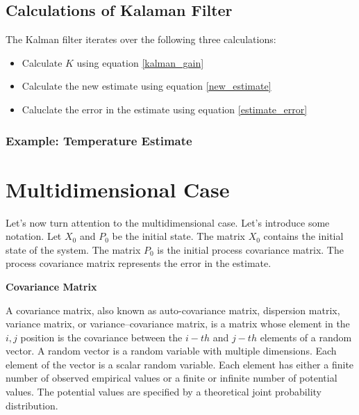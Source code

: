 \subsection{Calculations of Kalaman Filter}
The Kalman filter iterates over the following three calculations:

\begin{itemize}
\item Calculate $K$ using equation \ref{kalman_gain}
\item Calculate the new estimate using equation \ref{new_estimate} 
\item Caluclate the error in the estimate using equation \ref{estimate_error}
\end{itemize}


\subsubsection{Example: Temperature Estimate}



\section{Multidimensional Case}

Let's now turn attention to the multidimensional case. Let's introduce some notation. Let $X_0$ and $P_0$ be the initial state.
The matrix $X_0$ contains the initial state of the system. The matrix $P_0$ is the initial process covariance matrix. The process
covariance matrix represents the error in the estimate.


\begin{framed}
\theoremstyle{remark}
\begin{remark}{\textbf{Covariance Matrix}}

A covariance matrix, also known as auto-covariance matrix, dispersion matrix, variance matrix, or variance–covariance matrix, 
is a matrix whose element in the $i, j$ position is the covariance between the $i-th$ and $j-th$ elements of a random vector. 
A random vector is a random variable with multiple dimensions. 
Each element of the vector is a scalar random variable. 
Each element has either a finite number of observed empirical values or a finite or infinite number of potential values. 
The potential values are specified by a theoretical joint probability distribution. 
\end{remark}
\end{framed}



